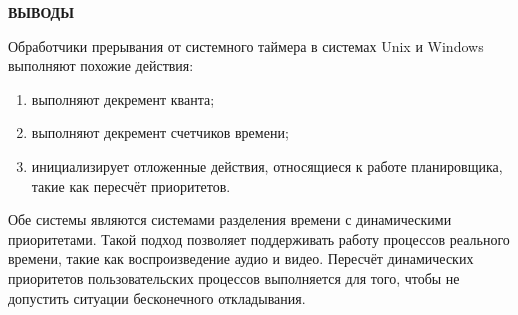 \begin{center}
    \textbf{ВЫВОДЫ}
\end{center}

Обработчики прерывания от системного таймера в системах Unix и Windows выполняют похожие действия:

\begin{enumerate} 
	\item выполняют декремент кванта;
	\item выполняют декремент счетчиков времени;
	\item инициализирует отложенные действия, относящиеся к работе планировщика, такие как пересчёт приоритетов.

\end{enumerate} 

Обе системы являются системами разделения времени с динамическими приоритетами. Такой подход позволяет 
поддерживать работу процессов реального времени, такие как воспроизведение аудио и видео. Пересчёт динамических приоритетов пользовательских 
процессов выполняется для того, чтобы не допустить ситуации бесконечного откладывания.
